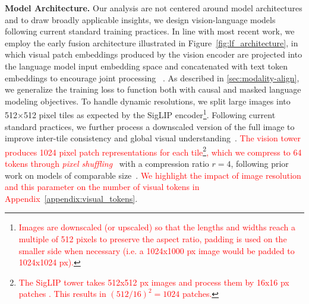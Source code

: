 \noindent\textbf{Model Architecture.}  
Our analysis are not centered around model architectures and to draw broadly applicable insights, we design vision-language models following current standard training practices.  In line with most recent work, we employ the early fusion architecture \citep{alayrac2022flamingovisuallanguagemodel} illustrated in Figure~\ref{fig:lf_architecture}, in which visual patch embeddings produced by the vision encoder are projected into the language model input embedding space and concatenated with text token embeddings to encourage joint processing ~\citep{li2022blipbootstrappinglanguageimagepretraining,alayrac2022flamingovisuallanguagemodel,wang2024qwen2vlenhancingvisionlanguagemodels,yang2025qwen251mtechnicalreport,marafioti2025smolvlmredefiningsmallefficient}. As described in \autoref{sec:modality-align}, we generalize the training loss to function both with causal and masked language modeling objectives.  
To handle dynamic resolutions, we split large images into 512$\times$512 pixel tiles as expected by the SigLIP encoder\textcolor{red}{\footnote{\textcolor{red}{Images are downscaled (or upscaled) so that the lengths and widths reach a multiple of 512 pixels to preserve the aspect ratio, padding is used on the smaller side when necessary (i.e. a 1024x1000 px image would be padded to 1024x1024 px).}}}. Following current standard practices, we further process a downscaled version of the full image to improve inter-tile consistency and global visual understanding~\citep{lin2023sphinxjointmixingweights,ye2023ureaderuniversalocrfreevisuallysituated}. \textcolor{red}{The vision tower produces 1024 pixel patch representations for each tile\footnote{\textcolor{red}{The SigLIP tower takes 512x512 px images and process them by 16x16 px patches \citep{dosovitskiy_image_2020}. This results in $(512/16)^2=1024$ patches.}}, which we  compress to 64 tokens through \textit{pixel shuffling}~\citep{shi2016realtimesingleimagevideo}} with a compression ratio $r=4$, following prior work on models of comparable size~\citep{marafioti2025smolvlmredefiningsmallefficient}. \textcolor{red}{We highlight the impact of image resolution and this parameter on the number of visual tokens in Appendix~\ref{appendix:visual_tokens}}.


